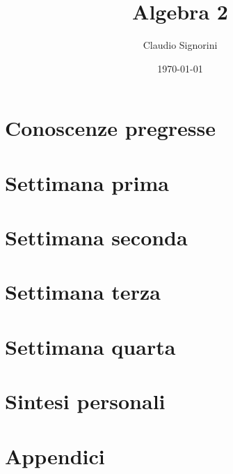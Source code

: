 \documentclass[a4paper,11pt]{book}
\title{Algebra 2}
\author{Claudio Signorini}
\date{\today}
\begin{document}
	
	
	
	\part{Conoscenze pregresse}
	
	
	
	
	
	
	
	\part{Settimana prima}
	
		
	
	
	
	\part{Settimana seconda}
	
	
	
	
	
	
	

	\part{Settimana terza}
	
	
	

	\part{Settimana quarta}
	

	\part{Sintesi personali}
	

	\part{Appendici}
	
	

	\printbibliography[heading=bibintoc,title={Bibliografia}]

	\listoffigures

	\tableofcontents
\end{document}
